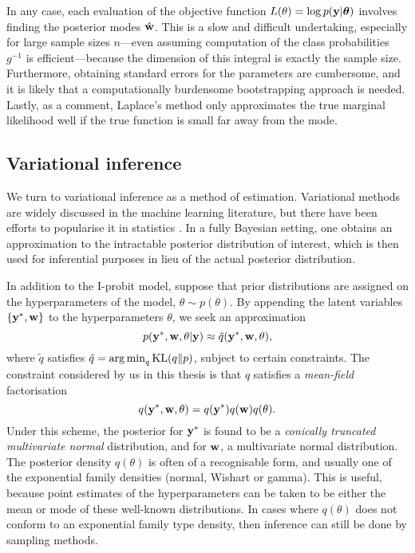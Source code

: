 In any case, each evaluation of the objective function $L(\theta) = \log p({\mathbf y}|{\bm\theta})$ involves finding the posterior modes $\hat{{\mathbf w}}$.
This is a slow and difficult undertaking, especially for large sample sizes $n$---even assuming computation of the class probabilities $g^{-1}$ is efficient---because the dimension of this integral is exactly the sample size.
Furthermore, obtaining standard errors for the parameters are cumbersome, and it is likely that a computationally burdensome bootstrapping approach is needed.
Lastly, as a comment, Laplace's method only approximates the true marginal likelihood well if the true function is small far away from the mode.

\subsection{Variational inference}

We turn to variational inference as a method of estimation. 
Variational methods are widely discussed in the machine learning literature, but there have been efforts to popularise it in statistics \citep{blei2017variational}.
In a fully Bayesian setting, one obtains an approximation to the intractable posterior distribution of interest, which is then used for inferential purposes in lieu of the actual posterior distribution.

In addition to the I-probit model, suppose that prior distributions are assigned on the hyperparameters of the model, $\theta \sim p(\theta)$.
By appending the latent variables $\{{\mathbf y}^*,{\mathbf w}\}$ to the hyperparameters $\theta$, we seek an approximation
\[
  p({\mathbf y}^*,{\mathbf w},\theta | {\mathbf y}) \approx \tilde q({\mathbf y}^*,{\mathbf w},\theta),
\]
where $\tilde q$ satisfies $\tilde q = \operatorname*{arg\,min}_q \operatorname{KL}(q\Vert p)$, subject to certain constraints.
The constraint considered by us in this thesis is that $q$ satisfies a \emph{mean-field} factorisation
\[
  q({\mathbf y}^*,{\mathbf w},\theta) = q({\mathbf y}^*)q({\mathbf w})q(\theta).
\]
Under this scheme, the posterior for ${\mathbf y}^*$ is found to be a \emph{conically truncated multivariate normal} distribution, and for ${\mathbf w}$, a multivariate normal distribution.
The posterior density $q(\theta)$ is often of a recognisable form, and usually one of the exponential family densities (normal, Wishart or gamma).
This is useful, because point estimates of the hyperparameters can be taken to be either the mean or mode of these well-known distributions.
In cases where $q(\theta)$ does not conform to an exponential family type density, then inference can still be done by sampling methods.

